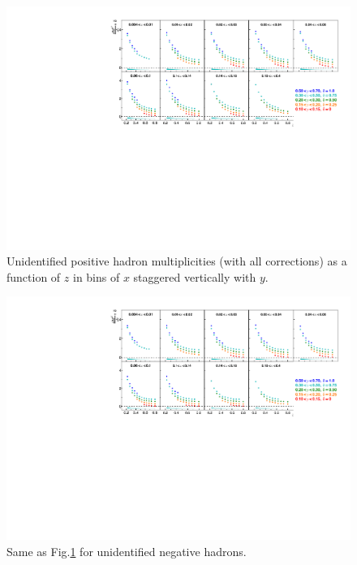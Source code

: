 \begin{figure}[!h]
  \centering
	\includegraphics[scale=0.85]{./gfx/hp.pdf}
	\caption{Unidentified positive hadron multiplicities (with all corrections) as a function of $z$ in bins of $x$ staggered vertically with $y$.}
	\label{pic:mhp}
\end{figure}

\newpage
\null
\vfill
\begin{figure}[!h]
  \centering
	\includegraphics[scale=0.85]{./gfx/hm.pdf}
	\caption{Same as Fig.\ref{pic:mhp} for unidentified negative hadrons.}
	\label{pic:mhm}
\end{figure}

